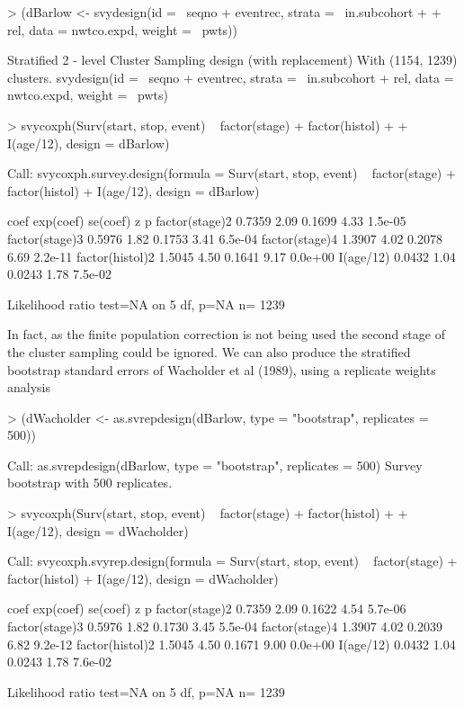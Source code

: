 \documentclass{article}
\begin{document}
\begin{Schunk}
\begin{Sinput}
> (dBarlow <- svydesign(id = ~seqno + eventrec, strata = ~in.subcohort + 
+     rel, data = nwtco.expd, weight = ~pwts))
\end{Sinput}
\begin{Soutput}
Stratified 2 - level Cluster Sampling design (with replacement)
With (1154, 1239) clusters.
svydesign(id = ~seqno + eventrec, strata = ~in.subcohort + rel, 
    data = nwtco.expd, weight = ~pwts)
\end{Soutput}
\begin{Sinput}
> svycoxph(Surv(start, stop, event) ~ factor(stage) + factor(histol) + 
+     I(age/12), design = dBarlow)
\end{Sinput}
\begin{Soutput}
Call:
svycoxph.survey.design(formula = Surv(start, stop, event) ~ factor(stage) + 
    factor(histol) + I(age/12), design = dBarlow)


                  coef exp(coef) se(coef)    z       p
factor(stage)2  0.7359      2.09   0.1699 4.33 1.5e-05
factor(stage)3  0.5976      1.82   0.1753 3.41 6.5e-04
factor(stage)4  1.3907      4.02   0.2078 6.69 2.2e-11
factor(histol)2 1.5045      4.50   0.1641 9.17 0.0e+00
I(age/12)       0.0432      1.04   0.0243 1.78 7.5e-02

Likelihood ratio test=NA  on 5 df, p=NA  n= 1239 
\end{Soutput}
\end{Schunk}

In fact, as the finite population correction is not being used the second stage of the cluster sampling could be ignored.   We can also produce the stratified bootstrap standard errors of Wacholder et al (1989), using a replicate weights analysis

\begin{Schunk}
\begin{Sinput}
> (dWacholder <- as.svrepdesign(dBarlow, type = "bootstrap", replicates = 500))
\end{Sinput}
\begin{Soutput}
Call: as.svrepdesign(dBarlow, type = "bootstrap", replicates = 500)
Survey bootstrap with 500 replicates.
\end{Soutput}
\begin{Sinput}
> svycoxph(Surv(start, stop, event) ~ factor(stage) + factor(histol) + 
+     I(age/12), design = dWacholder)
\end{Sinput}
\begin{Soutput}
Call:
svycoxph.svyrep.design(formula = Surv(start, stop, event) ~ factor(stage) + 
    factor(histol) + I(age/12), design = dWacholder)


                  coef exp(coef) se(coef)    z       p
factor(stage)2  0.7359      2.09   0.1622 4.54 5.7e-06
factor(stage)3  0.5976      1.82   0.1730 3.45 5.5e-04
factor(stage)4  1.3907      4.02   0.2039 6.82 9.2e-12
factor(histol)2 1.5045      4.50   0.1671 9.00 0.0e+00
I(age/12)       0.0432      1.04   0.0243 1.78 7.6e-02

Likelihood ratio test=NA  on 5 df, p=NA  n= 1239 
\end{Soutput}
\end{Schunk}
\end{document}

